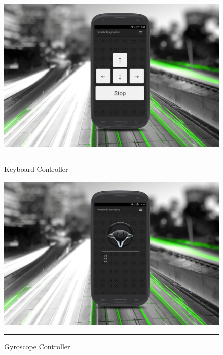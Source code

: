 \begin{figure}[h!]
  \centering
    \includegraphics[width=1\textwidth]{./Pictures/keyboard_controller.jpg}
  \rule{1\textwidth}{1pt}
 \caption{Keyboard Controller}
 \label{fig:keyboard_controller}
\end{figure}
\begin{figure}[h!]
  \centering
    \includegraphics[width=1\textwidth]{./Pictures/gyroscope_controller.jpg}
  \rule{1\textwidth}{1pt}
 \caption{Gyroscope Controller}
  \label{fig:gyroscope_controller}
\end{figure}
